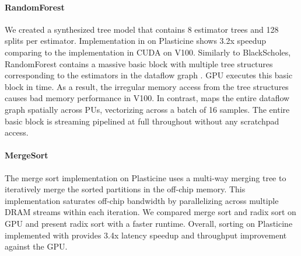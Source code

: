 \paragraph{RandomForest} We created a synthesized tree model that contains 8 estimator trees and 128 splits per estimator. 
Implementation in \name{} on Plasticine shows 3.2x speedup comparing to the implementation in CUDA on V100. 
Similarly to BlackScholes, RandomForest contains a massive basic block with multiple tree
structures corresponding to the estimators in the dataflow graph .
GPU executes this basic block in time. 
As a result, the irregular memory access from the tree structures causes bad memory performance in V100.
In contrast, \name{} maps the entire dataflow graph spatially across PUs, vectorizing across a batch of 16 samples.
The entire basic block is streaming pipelined at full throughout without any scratchpad access.

\paragraph{MergeSort} 
The merge sort implementation on Plasticine uses a multi-way merging tree to iteratively merge the sorted
partitions in the off-chip memory.
This implementation saturates off-chip bandwidth by parallelizing across multiple DRAM streams within
each iteration.
We compared merge sort and radix sort on GPU and present radix sort with a faster runtime.
Overall, sorting on Plasticine implemented with \name provides 3.4x latency speedup and throughput
improvement against the GPU.

